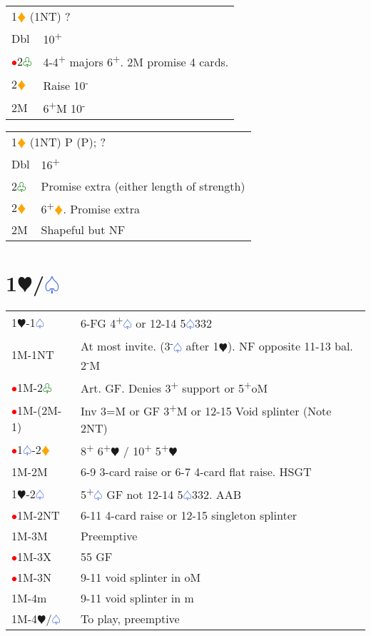 \documentclass{article}
\renewcommand{\sp}{\textcolor{RoyalBlue}{$\varspade$}}
\newcommand{\he}{\textcolor{RubineRed}{$\varheart$}}
\newcommand{\di}{\textcolor{Orange}{$\vardiamond$}}
\newcommand{\cl}{\textcolor{Green}{$\varclub$}}
\newcommand{\nt}{\relsize{-1}NT\relsize{1}}
\newcommand{\up}{\textsuperscript{+}}
\newcommand{\down}{\textsuperscript{-}}
\newcommand{\al}{\textcolor{red}{$\bullet$}}
\begin{document}
\medskip

\begin{tabular}{|l|p{6.5cm}}
	\multicolumn{2}{l}{1\di{} (1\nt{}) ?}\\
	Dbl & 10\up \\
	\al{}2\cl{} & 4-4\up{} majors 6\up{}. 2M promise 4 cards. \\
	2\di{} & Raise 10\down{} \\
	2M & 6\up{}M 10\down{} \\
\end{tabular}

\medskip

\begin{tabular}{|l|p{6.5cm}}
	\multicolumn{2}{l}{1\di{} (1\nt{}) P (P); ?}\\
	Dbl & 16\up{} \\
	2\cl{} & Promise extra (either length of strength) \\
	2\di{} & 6\up{}\di{}. Promise extra \\
	2M & Shapeful but NF \\
\end{tabular}

\section{1\he/\sp{}}

\begin{tabular}{|l|p{6.5cm}}
	1\he{}-1\sp{} & 6-FG 4\up\sp{} or 12-14 5\sp{}332 \\
	1M-1\nt{}& At most invite. (3\down\sp{} after 1\he{}). NF opposite 11-13 bal. 2\down{}M \\
	\al{}1M-2\cl{} & Art. GF. Denies 3\up{} support or 5\up{}oM \\
	\al{}1M-(2M-1) & Inv 3=M or GF 3\up{}M or 12-15 Void splinter (Note 2\nt{}) \\
	\al{}1\sp{}-2\di{} & 8\up{} 6\up{}\he{} / 10\up{} 5\up{}\he{} \\ 
	1M-2M & 6-9 3-card raise or 6-7 4-card flat raise. HSGT \\
	1\he{}-2\sp{} & 5\up{}\sp{} GF not 12-14 5\sp{}332. AAB \\ 
	\al{}1M-2\nt & 6-11 4-card raise or 12-15 singleton splinter \\
	1M-3M & Preemptive \\
	\al{}1M-3X & 55 GF \\
	\al{}1M-3N & 9-11 void splinter in oM \\
	1M-4m & 9-11 void splinter in m \\
	1M-4\he{}/\sp{} & To play, preemptive \\ 

\end{tabular}
\end{document}

